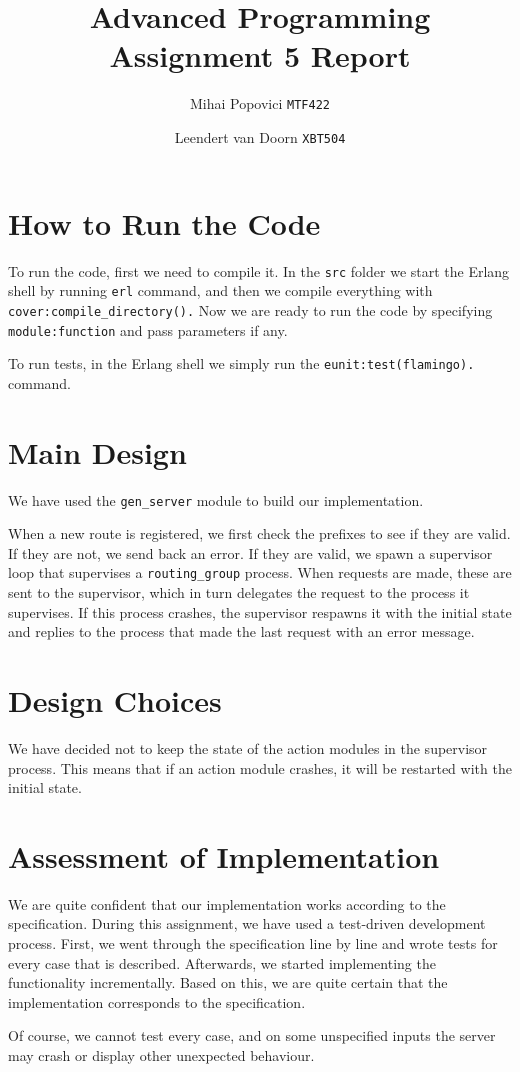 \documentclass{article}
\title{Advanced Programming Assignment 5 Report}
\author{Mihai Popovici \texttt{MTF422} \and Leendert van Doorn \texttt{XBT504}}
\begin{document}
	
	\maketitle	
	
	\section{How to Run the Code}
	To run the code, first we need to compile it. In the \texttt{src} folder we start the Erlang shell by running \texttt{erl} command, and then we compile everything with \texttt{cover:compile\_directory().}
	Now we are ready to run the code by specifying \texttt{module:function} and pass parameters if any.
	
	To run tests, in the Erlang shell we simply run the \texttt{eunit:test(flamingo).} command.
	
	\section{Main Design}
	We have used the \texttt{gen\_server} module to build our implementation. 
	
	When a new route is registered, we first check the prefixes to see if they are valid. If they are not, we send back an error. If they are valid, we spawn a supervisor loop that supervises a \texttt{routing\_group} process. When requests are made, these are sent to the supervisor, which in turn delegates the request to the process it supervises. If this process crashes, the supervisor respawns it with the initial state and replies to the process that made the last request with an error message.
	
	\section{Design Choices}
	We have decided not to keep the state of the action modules in the supervisor process. This means that if an action module crashes, it will be restarted with the initial state.
	
	\section{Assessment of Implementation}
	We are quite confident that our implementation works according to the specification. During this assignment, we have used a test-driven development process. First, we went through the specification line by line and wrote tests for every case that is described. Afterwards, we started implementing the functionality incrementally. Based on this, we are quite certain that the implementation corresponds to the specification.
	
	Of course, we cannot test every case, and on some unspecified inputs the server may crash or display other unexpected behaviour. 
	
\end{document}

